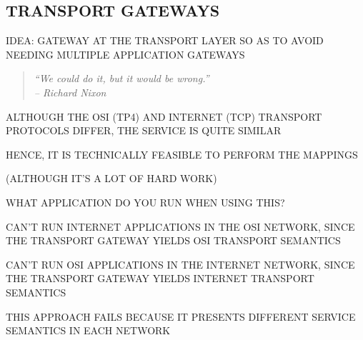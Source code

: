 \begin{bwslide}
\part*	{TRANSPORT GATEWAYS}\bf

\begin{nrtc}
\item	IDEA: GATEWAY AT THE TRANSPORT LAYER SO AS TO AVOID NEEDING
	MULTIPLE APPLICATION GATEWAYS
\begin{quote}\em
``We could do it, but it would be wrong.''\\ \raggedleft
-- Richard Nixon
\end{quote}

\item	ALTHOUGH THE OSI (TP4) AND INTERNET (TCP) TRANSPORT PROTOCOLS DIFFER,
	THE SERVICE IS QUITE SIMILAR

\item	HENCE, IT IS TECHNICALLY FEASIBLE TO PERFORM THE MAPPINGS
    \begin{nrtc}
    \item	(ALTHOUGH IT'S A LOT OF HARD WORK)
    \end{nrtc}
\end{nrtc}
\end{bwslide}




\begin{bwslide}

\begin{nrtc}
\item	WHAT APPLICATION DO YOU RUN WHEN USING THIS?
    \begin{nrtc}
    \item	CAN'T RUN INTERNET APPLICATIONS IN THE OSI NETWORK,
		SINCE THE TRANSPORT GATEWAY YIELDS OSI TRANSPORT SEMANTICS

    \item	CAN'T RUN OSI APPLICATIONS IN THE INTERNET NETWORK,
		SINCE THE TRANSPORT GATEWAY YIELDS INTERNET TRANSPORT SEMANTICS
    \end{nrtc}

\item	THIS APPROACH FAILS BECAUSE IT PRESENTS DIFFERENT SERVICE SEMANTICS
	IN EACH NETWORK
\end{nrtc}
\end{bwslide}


